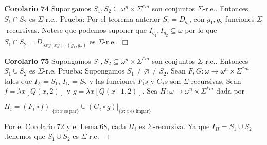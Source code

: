 \textbf{Corolario 74} Supongamos \(S_{1},S_{2}\subseteq \omega ^{n}\times \Sigma ^{\ast m}\) son conjuntos \(\Sigma \)-r.e.. Entonces \(S_{1}\cap S_{2}\) es \(\Sigma \)-r.e..
Prueba: Por el teorema anterior \(S_{i}=D_{g_{i}}\), con \(g_{1},g_{2}\) funciones \( \Sigma \)-recursivas\(.\) Notese que podemos suponer que \(I_{g_{1}},I_{g_{2}} \subseteq \omega \) por lo que \(S_{1}\cap S_{2}=D_{\lambda xy\left[ xy\right] \circ (g_{1},g_{2})}\) es \(\Sigma \)-r.e.\(.\) \(\Box\)





\textbf{Corolario 75} Supongamos \(S_{1},S_{2}\subseteq \omega ^{n}\times \Sigma ^{\ast m}\) son conjuntos \(\Sigma \)-r.e.. Entonces \(S_{1}\cup S_{2}\) es \(\Sigma \)-r.e.
Prueba: Supongamos \(S_{1}\neq \varnothing \neq S_{2}.\) Sean \(F,G:\omega \rightarrow \omega ^{n}\times \Sigma ^{\ast m}\) tales que \(I_{F}=S_{1}\), \(I_{G}=S_{2}\) y las funciones \(F_{i} {\acute{}} s\) y \(G_{i} {\acute{}} s\) son \(\Sigma \)-recursivas. Sean \(f=\lambda x\left[ Q(x,2)\right] \) y \( g=\lambda x\left[ Q(x\dot{-}1,2)\right] .\) Sea \(H:\omega \rightarrow \omega ^{n}\times \Sigma ^{\ast m}\) dada por

\(\displaystyle H_{i}=(F_{i}\circ f)\mathrm{\mid }_{\{x:x\mathrm{\ es\ par}\}}\cup (G_{i}\circ g)\mathrm{\mid }_{\{x:x\mathrm{\ es\ impar}\}} \)

Por el Corolario 72 y el Lema 68, cada \(H_{i}\) es \( \Sigma \)-recursiva. Ya que \(I_{H}=S_{1}\cup S_{2}\).tenemos que \(S_{1}\cup S_{2}\) es \(\Sigma \)-r.e. \(\Box\)
